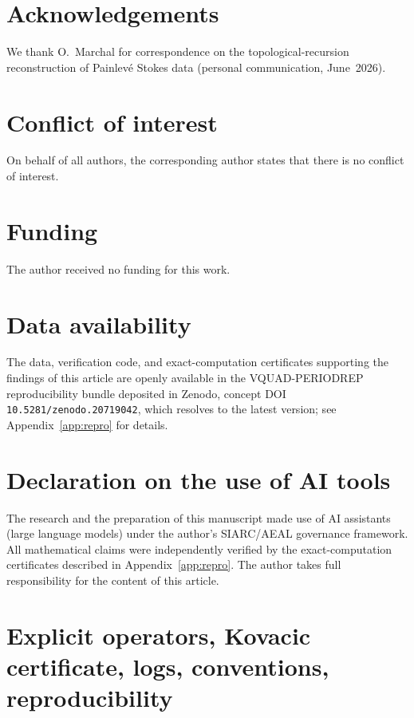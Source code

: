 \documentclass[11pt,reqno]{amsart}
\renewcommand{\_}{\vquadorigunderscore\allowbreak}
\theoremstyle{plain}
\theoremstyle{definition}
\begin{document}
\section*{Acknowledgements}
We thank O.~Marchal for correspondence on the topological-recursion reconstruction of Painlev\'e
Stokes data (personal communication, June~2026).

\section*{Conflict of interest}
On behalf of all authors, the corresponding author states that there is no conflict of interest.

\section*{Funding}
The author received no funding for this work.

\section*{Data availability}
The data, verification code, and exact-computation certificates supporting the findings of this
article are openly available in the VQUAD-PERIODREP reproducibility bundle deposited in Zenodo,
concept DOI \texttt{10.5281/zenodo.20719042}, which resolves to the latest version; see
Appendix~\ref{app:repro} for details.

\section*{Declaration on the use of AI tools}
The research and the preparation of this manuscript made use of AI assistants (large language
models) under the author's SIARC/AEAL governance framework. All mathematical claims were
independently verified by the exact-computation certificates described in
Appendix~\ref{app:repro}. The author takes full responsibility for the content of this article.

\appendix
\section{Explicit operators, Kovacic certificate, logs, conventions, reproducibility}\label{app:all}
\end{document}
